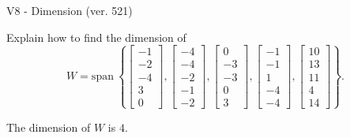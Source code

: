 \begin{exercise}
  \begin{exerciseTitle}V8 - Dimension (ver. 521)\end{exerciseTitle}
  \begin{exerciseStatement}
    Explain how to find the dimension of 
\[W=\mathrm{span}\ \left\{\left[\begin{array}{r}
-1 \\
-2 \\
-4 \\
3 \\
0
\end{array}\right] , \left[\begin{array}{r}
-4 \\
-4 \\
-2 \\
-1 \\
-2
\end{array}\right] , \left[\begin{array}{r}
0 \\
-3 \\
-3 \\
0 \\
3
\end{array}\right] , \left[\begin{array}{r}
-1 \\
-1 \\
1 \\
-4 \\
-4
\end{array}\right] , \left[\begin{array}{r}
10 \\
13 \\
11 \\
4 \\
14
\end{array}\right]\right\}.\]



  \end{exerciseStatement}
  \begin{exerciseAnswer}
   The dimension of \(W\) is  \(4\).
  


  \end{exerciseAnswer}
\end{exercise}